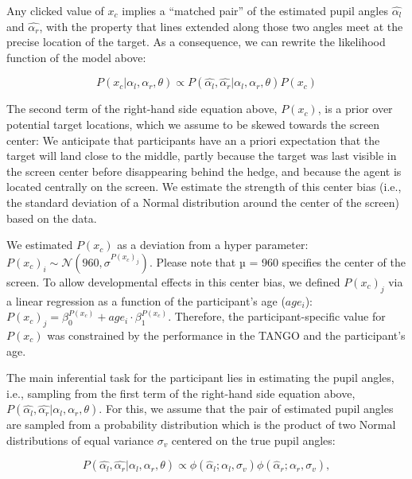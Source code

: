\documentclass[
  man,mask,floatsintext]{apa6}
\begin{document}
Any clicked value of \(x_c\) implies a ``matched pair'' of the estimated pupil angles \(\hat{\alpha_l}\) and \(\hat{\alpha_r}\), with the property that lines extended along those two angles meet at the precise location of the target. As a consequence, we can rewrite the likelihood function of the model above:

\begin{equation}
P(x_c | \alpha_l, \alpha_r, \theta) \propto P(\hat{\alpha_l}, \hat{\alpha_r} | \alpha_l, \alpha_r, \theta) P(x_c)
\end{equation}

The second term of the right-hand side equation above, \(P(x_c)\), is a prior over potential target locations, which we assume to be skewed towards the screen center: We anticipate that participants have an a priori expectation that the target will land close to the middle, partly because the target was last visible in the screen center before disappearing behind the hedge, and because the agent is located centrally on the screen. We estimate the strength of this center bias (i.e., the standard deviation of a Normal distribution around the center of the screen) based on the data.

We estimated \(P(x_c)\) as a deviation from a hyper parameter: \(P(x_c)_i \sim \mathcal{N}(960,\sigma^{P(x_c)_j})\). Please note that µ = 960 specifies the center of the screen. To allow developmental effects in this center bias, we defined \(P(x_c)_j\) via a linear regression as a function of the participant's age (\(age_i\)): \(P(x_c)_j = \beta_0^{P(x_c)} + age_i \cdot \beta_1^{P(x_c)}\). Therefore, the participant-specific value for \(P(x_c)\) was constrained by the performance in the TANGO and the participant's age.

The main inferential task for the participant lies in estimating the pupil angles, i.e., sampling from the first term of the right-hand side equation above, \(P(\hat{\alpha_l}, \hat{\alpha_r} | \alpha_l, \alpha_r, \theta)\). For this, we assume that the pair of estimated pupil angles are sampled from a probability distribution which is the product of two Normal distributions of equal variance \(\sigma_v\) centered on the true pupil angles:

\begin{equation}
P(\hat{\alpha_l}, \hat{\alpha_r} | \alpha_l, \alpha_r, \theta) \propto \phi(\hat{\alpha}_l ; \alpha_l, \sigma_v)\phi(\hat{\alpha}_r ; \alpha_r, \sigma_v),
\end{equation}
\end{document}

